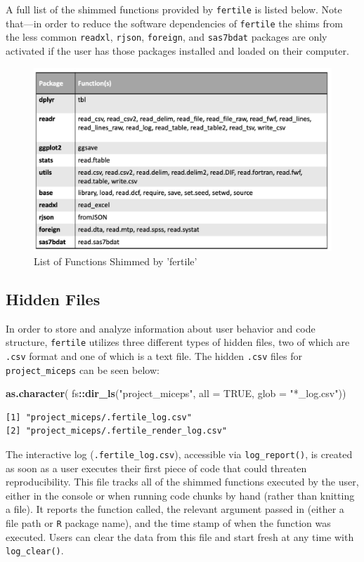 \documentclass[12pt,twoside]{reedthesis}
\newenvironment{Shaded}{\begin{snugshade}}{\end{snugshade}}
\newcommand{\DataTypeTok}[1]{\textcolor[rgb]{0.13,0.29,0.53}{#1}}
\newcommand{\KeywordTok}[1]{\textcolor[rgb]{0.13,0.29,0.53}{\textbf{#1}}}
\newcommand{\NormalTok}[1]{#1}
\newcommand{\OperatorTok}[1]{\textcolor[rgb]{0.81,0.36,0.00}{\textbf{#1}}}
\newcommand{\OtherTok}[1]{\textcolor[rgb]{0.56,0.35,0.01}{#1}}
\newcommand{\StringTok}[1]{\textcolor[rgb]{0.31,0.60,0.02}{#1}}
\begin{document}
A full list of the shimmed functions provided by \texttt{fertile} is listed below. Note that---in order to reduce the software dependencies of \texttt{fertile} the shims from the less common \texttt{readxl}, \texttt{rjson}, \texttt{foreign}, and \texttt{sas7bdat} packages are only activated if the user has those packages installed and loaded on their computer.
\begin{figure}
\includegraphics[width=1\linewidth]{figure/shims-list} \caption{List of Functions Shimmed by 'fertile'}\label{fig:unnamed-chunk-50}
\end{figure}
\hypertarget{hidden-files}{%
\subsection{Hidden Files}\label{hidden-files}}

In order to store and analyze information about user behavior and code structure, \texttt{fertile} utilizes three different types of hidden files, two of which are \texttt{.csv} format and one of which is a text file. The hidden \texttt{.csv} files for \texttt{project\_miceps} can be seen below:
\begin{Shaded}
\begin{Highlighting}[]
\KeywordTok{as.character}\NormalTok{(}
\NormalTok{  fs}\OperatorTok{::}\KeywordTok{dir_ls}\NormalTok{(}\StringTok{"project_miceps"}\NormalTok{, }\DataTypeTok{all =} \OtherTok{TRUE}\NormalTok{, }\DataTypeTok{glob =} \StringTok{"*_log.csv"}\NormalTok{))}
\end{Highlighting}
\end{Shaded}
\begin{verbatim}
[1] "project_miceps/.fertile_log.csv"       
[2] "project_miceps/.fertile_render_log.csv"
\end{verbatim}
The interactive log (\texttt{.fertile\_log.csv}), accessible via \texttt{log\_report()}, is created as soon as a user executes their first piece of code that could threaten reproducibility. This file tracks all of the shimmed functions executed by the user, either in the console or when running code chunks by hand (rather than knitting a file). It reports the function called, the relevant argument passed in (either a file path or \texttt{R} package name), and the time stamp of when the function was executed. Users can clear the data from this file and start fresh at any time with \texttt{log\_clear()}.
\end{document}
